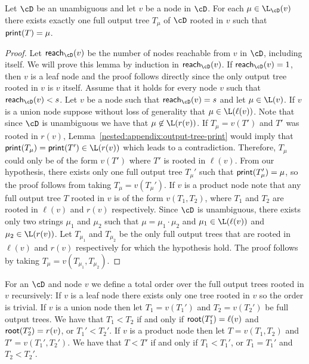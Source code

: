 \begin{lemma}\label{nested:appendix:output-tree-unique}
	Let $\cD$ be an unambiguous \dsabbr and let $v$ be a node in $\cD$. For each $\mu\in\L_{\cD}(v)$ there exists exactly one full output tree $T_{\mu}$ of $\cD$ rooted in $v$ such that ${\sf print}(T) = \mu$.
\end{lemma}
\begin{proof}
	Let ${\sf reach_{\cD}}(v)$ be the number of nodes reachable from $v$ in $\cD$, including itself. We will prove this lemma by induction in ${\sf reach_{\cD}}(v)$. If ${\sf reach_{\cD}}(v) = 1$, then $v$ is a leaf node and the proof follows directly since the only output tree rooted in $v$ is $v$ itself. Assume that it holds for every node $v$ such that ${\sf reach_{\cD}}(v)< s$. Let $v$ be a node such that ${\sf reach_{\cD}}(v) = s$ and let $\mu\in\L(v)$. If $v$ is a union node suppose without loss of generality that $\mu\in\L(\ell(v))$. Note that since $\cD$ is unambiguous we have that $\mu\not\in\L(r(v))$. If $T_{\mu} = v(T')$ and $T'$ was rooted in $r(v)$, Lemma~\ref{nested:appendix:output-tree-print} would imply that ${\sf print}(T_{\mu}) = {\sf print}(T') \in \L(r(v))$ which leads to a contradiction. Therefore, $T_{\mu}$ could only be of the form $v(T')$ where $T'$ is rooted in $\ell(v)$. From our hypothesis, there exists only one full output tree $T_{\mu}'$ such that ${\sf print}(T_{\mu}') = \mu$, so the proof follows from taking $T_{\mu} = v(T_{\mu}')$. If $v$ is a product node note that any full output tree $T$ rooted in $v$ is of the form $v(T_1,T_2)$, where $T_1$ and $T_2$ are rooted in $\ell(v)$ and $r(v)$ respectively. Since $\cD$ is unambiguous, there exists only two strings $\mu_1$ and $\mu_2$ such that $\mu = \mu_1\cdot\mu_2$ and $\mu_1\in\L(\ell(v))$ and $\mu_2\in\L(r(v))$. Let $T_{\mu_1}$ and $T_{\mu_2}$ be the only full output trees that are rooted in $\ell(v)$ and $r(v)$ respectively for which the hypothesis hold. The proof follows by taking $T_{\mu} = v(T_{\mu_1},T_{\mu_2})$.
\end{proof} 

For an \dsabbr $\cD$ and node $v$ we define a total order over the full output trees rooted in $v$ recursively: If $v$ is a leaf node there exists only one tree rooted in $v$ so the order is trivial. If $v$ is a union node then let $T_1 = v(T_1')$ and $T_2 = v(T_2')$ be full output trees. We have that $T_1 < T_2$ if and only if ${\sf root}(T_1') = \ell(v)$ and ${\sf root}(T_2') = r(v)$, or $T_1' < T_2'$. If $v$ is a product node then let $T = v(T_1,T_2)$ and $T' = v(T_1',T_2')$. We have that $T < T'$ if and only if $T_1 < T_1'$, or $T_1 = T_1'$ and $T_2 < T_2'$.

